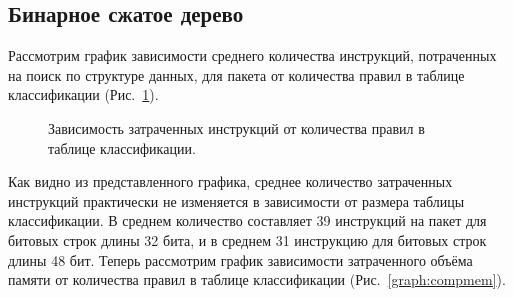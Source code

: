 \documentclass[conference]{IEEEtran}
\begin{document}
        \subsection{Бинарное сжатое дерево}
            Рассмотрим график зависимости среднего количества инструкций, потраченных на поиск по структуре данных, для пакета от количества правил в таблице классификации (Рис.~\ref{graph:compinst}).
            \begin{figure}[h!]
                \centering
                \captionsetup{justification=centering}
                \caption{Зависимость затраченных инструкций от количества правил в таблице классификации.}
                \label{graph:compinst}
            \end{figure}
            Как видно из представленного графика, среднее количество затраченных инструкций практически не изменяется в зависимости от размера таблицы классификации. 
            В среднем количество составляет 39 инструкций на пакет для битовых строк длины 32 бита, и в среднем 31 инструкцию для битовых строк длины 48 бит.
            Теперь рассмотрим график зависимости затраченного объёма памяти от количества правил в таблице классификации (Рис.~\ref{graph:compmem}).
\end{document}
